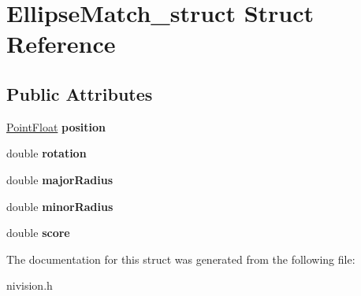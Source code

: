 \hypertarget{structEllipseMatch__struct}{
\section{EllipseMatch\_\-struct Struct Reference}
\label{structEllipseMatch__struct}
}
\subsection*{Public Attributes}
\begin{DoxyCompactItemize}
\item 
\hypertarget{structEllipseMatch__struct_a5e0a4793f84bc9b0d029c968ca910311}{
\hyperlink{structPointFloat__struct}{PointFloat} {\bfseries position}}
\label{structEllipseMatch__struct_a5e0a4793f84bc9b0d029c968ca910311}

\item 
\hypertarget{structEllipseMatch__struct_a665ff2c0e042b5941adc2df8b88943e8}{
double {\bfseries rotation}}
\label{structEllipseMatch__struct_a665ff2c0e042b5941adc2df8b88943e8}

\item 
\hypertarget{structEllipseMatch__struct_ab4730c5ab8911662de18ef06a7ed4592}{
double {\bfseries majorRadius}}
\label{structEllipseMatch__struct_ab4730c5ab8911662de18ef06a7ed4592}

\item 
\hypertarget{structEllipseMatch__struct_af646e73f724fdfe86e783e3a3bbeacee}{
double {\bfseries minorRadius}}
\label{structEllipseMatch__struct_af646e73f724fdfe86e783e3a3bbeacee}

\item 
\hypertarget{structEllipseMatch__struct_a5557181c755b6ea9a94d24f399a16976}{
double {\bfseries score}}
\label{structEllipseMatch__struct_a5557181c755b6ea9a94d24f399a16976}

\end{DoxyCompactItemize}


The documentation for this struct was generated from the following file:\begin{DoxyCompactItemize}
\item 
nivision.h\end{DoxyCompactItemize}
